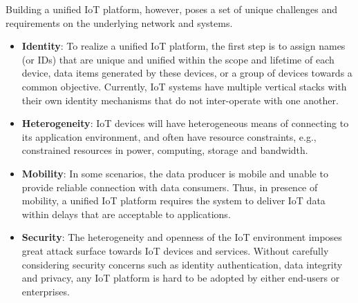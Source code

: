 Building a unified IoT platform, however, poses a set of unique challenges and requirements on the underlying network and systems.
\begin{itemize}
\vspace{1mm}\item{\bf Identity}:
To realize a unified IoT platform, the first step is
to assign names (or IDs) that are unique and unified within the scope and lifetime of each device, data items generated by these devices, or a group of devices towards a common objective. Currently, IoT systems have multiple vertical stacks with their own identity mechanisms that do not inter-operate with one another.

\vspace{1mm}\item{\bf Heterogeneity}:
IoT devices will have heterogeneous means of connecting to its application environment, and often have resource constraints, e.g., constrained resources in power, computing, storage and bandwidth.

\vspace{1mm}\item{\bf Mobility}:
In some scenarios, the data producer is mobile and unable to provide reliable connection with data consumers. Thus, in presence of mobility, a unified IoT platform requires the system to deliver IoT data within delays that are acceptable to applications.

\vspace{1mm}\item{\bf Security}:
The heterogeneity and openness of the IoT environment imposes great attack surface towards IoT devices and services. Without carefully considering security concerns such as identity authentication, data integrity and privacy, any IoT platform is hard to be adopted by either end-users or enterprises.
\end{itemize}

